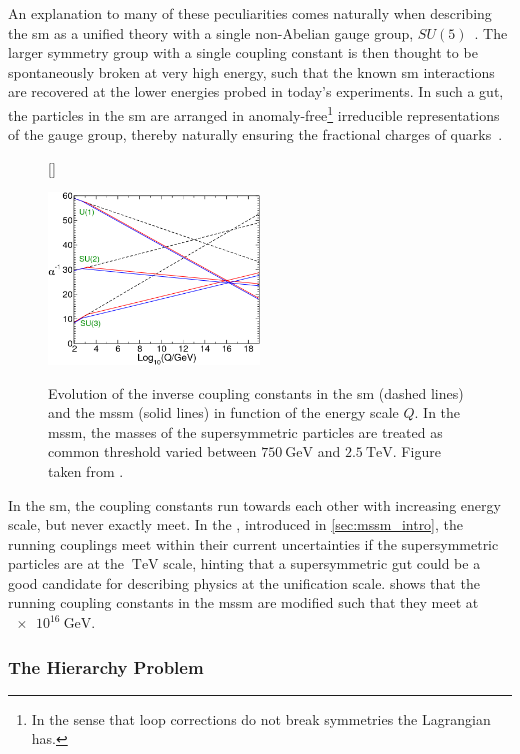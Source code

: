An explanation to many of these peculiarities comes naturally when describing the \gls{sm} as a unified theory with a single non-Abelian gauge group, \eg $SU(5)$~\cite{PhysRevLett.32.438}. The larger symmetry group with a single coupling constant is then thought to be spontaneously broken at very high energy, such that the known \gls{sm} interactions are recovered at the lower energies probed in today's experiments. In such a \gls{gut}, the particles in the \gls{sm} are arranged in anomaly-free\footnote{In the sense that loop corrections do not break symmetries the Lagrangian has.} irreducible representations of the gauge group, thereby \eg naturally ensuring the fractional charges of quarks~\cite{Peskin:1995ev}.
\begin{figure}
[\FBwidth]
{\caption{Evolution of the inverse coupling constants in the \gls{sm} (dashed lines) and the \gls{mssm} (solid lines) in function of the energy scale $Q$. In the \gls{mssm}, the masses of the supersymmetric particles are treated as common threshold varied between $\SI{750}{\GeV}$ and $\SI{2.5}{\TeV}$. Figure taken from \cite{Martin:1997ns}.}\label{fig:unification_forces}}
{\includegraphics[width=0.5\textwidth]{unification}}
\end{figure}

In the \gls{sm}, the coupling constants run towards each other with increasing energy scale, but never exactly meet. In the , introduced in \cref{sec:mssm_intro}, the running couplings meet within their current uncertainties if the supersymmetric particles are at the $\SI{}{\TeV}$ scale, hinting that a supersymmetric \gls{gut} could be a good candidate for describing physics at the unification scale.  shows that the running coupling constants in the \gls{mssm} are modified such that they meet at $\SI{e16}{\GeV}$.

\subsubsection{The Hierarchy Problem}


